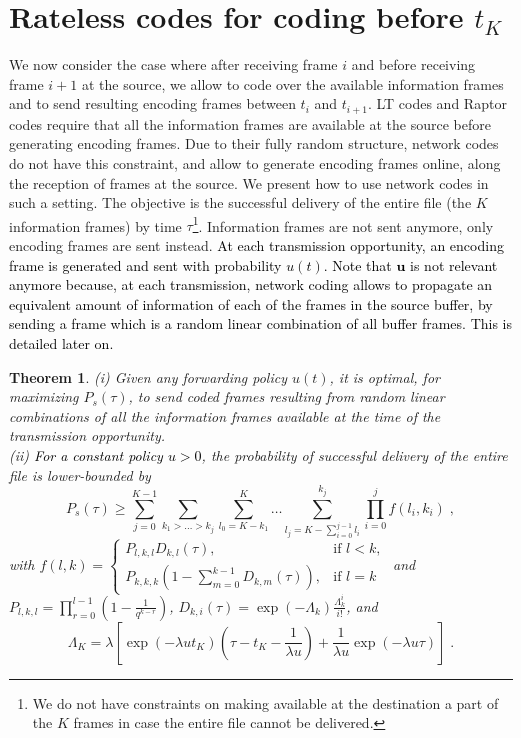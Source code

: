 \documentclass[10pt,twocolumn,conference,final]{IEEEtran}
\newtheorem{thm}{Theorem}[section]
\begin{document}
\section{Rateless codes for coding before $t_K$}\label{sec:ratbef}
We now consider the case where after receiving frame $i$ and before receiving frame $i+1$ at the source, we allow to code over the available information frames and to send resulting encoding frames between $t_i$ and $t_{i+1}$. LT codes and Raptor codes require that all the information frames are available at the source before generating encoding frames.  
Due to their fully random structure, network codes do not have this constraint, and allow to generate encoding frames online, along the reception of frames at the source. We present how to use network codes in such a setting.
The objective is the successful delivery of the entire file (the $K$ information frames) by time $\tau$\footnote{We do not have constraints on making available at the destination a part of the $K$ frames in case the entire file cannot be delivered.}. 
Information frames are not sent anymore, only encoding frames are sent instead. \textcolor{black}{At each transmission opportunity, an encoding frame is generated and sent with probability $u(t)$. Note that $\mathbf{u}$ is not relevant anymore because, at each transmission, network coding allows to propagate an equivalent amount of information of each of the frames in the source buffer, by sending a frame which is a random linear combination of all buffer frames. This is detailed later on.}
\begin{thm}\label{THbeforeTK}
(i) Given any forwarding policy $u(t)$, it is optimal, for maximizing $P_s(\tau)$, to send coded frames resulting from random linear combinations of all the information frames available at the time of the transmission opportunity.\\
(ii) \textcolor{black}{For a constant policy $u>0$}, the probability of successful delivery of the entire file is lower-bounded by
\[P_s(\tau)\geq\sum_{j=0}^{K-1}\sum_{k_1>\dots>k_j}\sum_{l_0=K-k_1}^{K}\dots\sum_{l_{j}=K-\sum_{i=0}^{j-1} l_i}^{k_j}\prod_{i=0}^j f(l_i,k_i)\;,\]
with
$f(l,k)=\left\{
\begin{array}{ll}
P_{l,k,l} D_{k,l}(\tau) ,&\mbox{if } l<k,\\
P_{k,k,k}\left(1-\sum_{m=0}^{k-1}D_{k,m}(\tau)\right),&\mbox{if } l=k
\end{array}
\right.$
and $P_{l,k,l}=\prod_{r=0}^{l-1}\left(1-\frac{1}{q^{k-r}}\right)$,
$D_{k,i}(\tau)=\exp(-\Lambda_k)\frac{\Lambda_k^i}{i!}$, and
\[\Lambda_K=\lambda\left[\exp(-\lambda u t_K)\left(\tau-t_K-\frac{1}{\lambda u}\right)+\frac{1}{\lambda u}\exp(-\lambda u \tau)\right]\;.\]
\end{thm}
\end{document}
